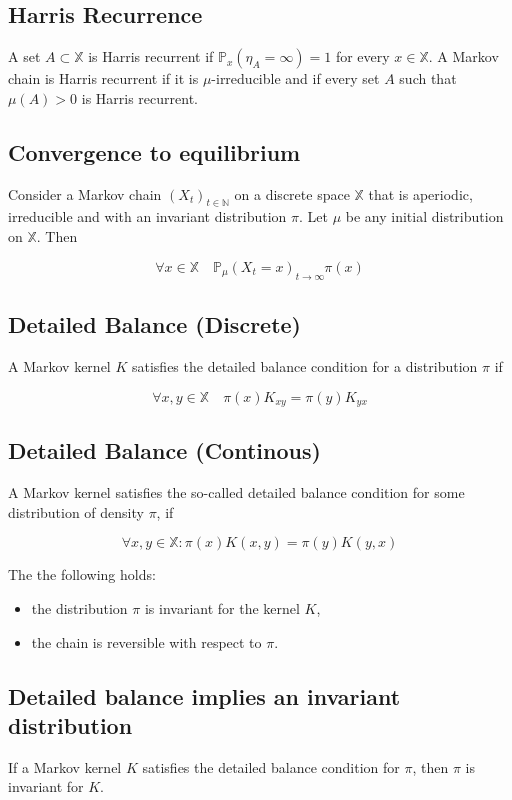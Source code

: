 \documentclass[10pt]{article}
\begin{document}
 \subsection{Harris Recurrence}
 A set $A \subset \mathbb{X}$ is Harris recurrent if $\mathbb{P}_{x}\left(\eta_{A}=\infty\right)=1$ for every $x \in \mathbb{X}$. A Markov chain is Harris recurrent if it is $\mu$-irreducible and if every set $A$ such that $\mu(A)>0$ is Harris recurrent.

 
\subsection{Convergence to equilibrium}
Consider a Markov chain $\left(X_{t}\right)_{t \in \mathbb{N}}$ on a discrete space $\mathbb{X}$ that is aperiodic, irreducible and with an invariant distribution $\pi$. Let $\mu$ be any initial distribution on $\mathbb{X}$. Then

$$
\forall x \in \mathbb{X} \quad \mathbb{P}_{\mu}\left(X_{t}=x\right) \underset{t \rightarrow \infty}{ } \pi(x)
$$

\subsection{Detailed Balance (Discrete)}
A Markov kernel $K$ satisfies the detailed balance condition for a distribution $\pi$ if

$$
\forall x, y \in \mathbb{X} \quad \pi(x) K_{x y}=\pi(y) K_{y x}
$$
\subsection{Detailed Balance (Continous)}
A Markov kernel satisfies the so-called detailed balance condition for some distribution of density $\pi$, if

$$
\forall x, y \in \mathbb{X}: \pi(x) K(x, y)=\pi(y) K(y, x)
$$

The the following holds:

\begin{itemize}
  \item the distribution $\pi$ is invariant for the kernel $K$,
  \item the chain is reversible with respect to $\pi$.
\end{itemize}

\subsection{Detailed balance implies an invariant distribution}
If a Markov kernel $K$ satisfies the detailed balance condition for $\pi$, then $\pi$ is invariant for $K$.
\end{document}

